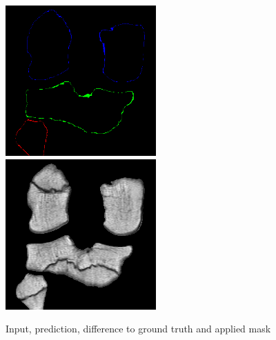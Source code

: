 \begin{figure}[H]
\endminipage\hfill
{}%
  \includegraphics[width=\linewidth]{imgs/c4.png}
\endminipage\hfill
{}%
  \includegraphics[width=\linewidth]{imgs/d4.png}
\endminipage
\caption{Input, prediction, difference to ground truth and applied mask}
\end{figure}

